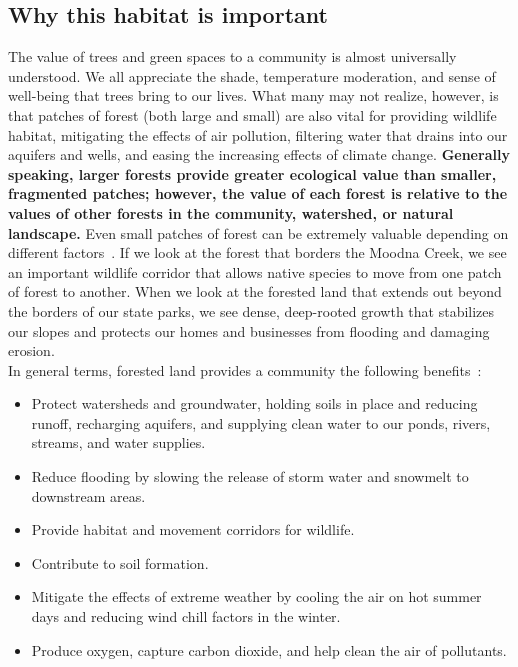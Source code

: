 \subsection*{Why this habitat is important}
The value of trees and green spaces to a community is almost universally
understood. We all appreciate the shade, temperature moderation, and sense of
well-being that trees bring to our lives. What many may not realize, however,
is that patches of forest (both large and small) are also vital for providing
wildlife habitat, mitigating the effects of air pollution, filtering water that
drains into our aquifers and wells, and easing the increasing effects of
climate change. \textbf{Generally speaking, larger forests provide greater
ecological value than smaller, fragmented patches; however, the value of each
forest is relative to the values of other forests in the community, watershed,
or natural landscape.} Even small patches of forest can be extremely valuable
depending on different factors~\citep{haeckel2014}. If we look at the forest
that borders the Moodna Creek, we see an important wildlife corridor that
allows native species to move from one patch of forest to another. When we look
at the forested land that extends out beyond the borders of our state parks, we
see dense, deep-rooted growth that stabilizes our slopes and protects our homes
and businesses from flooding and damaging erosion.\\
In general terms, forested land provides a community the following benefits~\citep{bradfordcc}:
\begin{itemize}
    \item Protect watersheds and groundwater, holding soils in place and 
    reducing runoff, recharging aquifers, and supplying clean water to our 
    ponds, rivers, streams, and water supplies.
    \item Reduce flooding by slowing the release of storm water and snowmelt to downstream areas.
    \item Provide habitat and movement corridors for wildlife.
    \item Contribute to soil formation. 
    \item Mitigate the effects of extreme weather by cooling the air on hot summer days and reducing wind chill factors in the winter.
    \item Produce oxygen, capture carbon dioxide, and help clean the air of pollutants.
\end{itemize}
